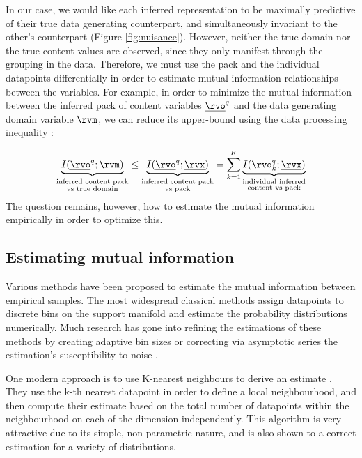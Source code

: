 \documentclass[withindex,glossary,firstyr,times]{cam-thesis}
\begin{document}
In our case, we would like each inferred representation to be maximally predictive of their true data generating counterpart, and simultaneously invariant to the other's counterpart (Figure \ref{fig:nuisance}). However, neither the true domain nor the true content values are observed, since they only manifest through the grouping in the data. Therefore, we must use the pack and the individual datapoints differentially in order to estimate mutual information relationships between the variables. For example, in order to minimize the mutual information between the inferred pack of content variables $\underline{\rvo}^{q}$ and the data generating domain variable $\rvm$, we can reduce its upper-bound using the data processing inequality \cite{cover1999elements}:

\begin{equation}
    \underbrace{I(\underline{\rvo}^q; \rvm)}_{\substack{\text{inferred content pack} \\ \text{vs true domain}}} \leq \underbrace{I(\underline{\rvo}^q; \underline{\rvx})}_{\substack{\text{inferred content pack} \\ \text{vs pack}}} = \sum_{k=1}^K \underbrace{I(\rvo^q_k; \underline{\rvx})}_{\substack{\text{individual inferred} \\ \text{content vs pack}}}
    \label{eq:content_bottle}
\end{equation}
The question remains, however, how to estimate the mutual information empirically in order to optimize this.

\subsection{Estimating mutual information}

Various methods have been proposed to estimate the mutual information between empirical samples. The most widespread classical methods assign datapoints to discrete bins on the support manifold and estimate the probability distributions numerically. Much research has gone into refining the estimations of these methods by creating adaptive bin sizes \cite{fraser1986independent} or correcting via asymptotic series the estimation's susceptibility to noise \cite{grassberger1988finite}.

One modern approach is to use K-nearest neighbours to derive an estimate \cite{kraskov2004estimating}. They use the k-th nearest datapoint in order to define a local neighbourhood, and then compute their estimate based on the total number of datapoints within the neighbourhood on each of the dimension independently. This algorithm is very attractive due to its simple, non-parametric nature, and is also shown to a correct estimation for a variety of distributions.
\end{document}
